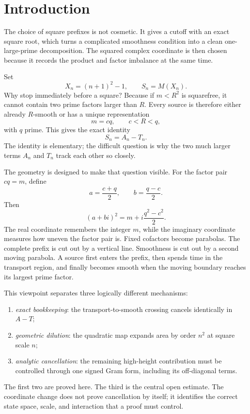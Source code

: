 \section{Introduction}
\label{sec:introduction}

The choice of square prefixes is not cosmetic.  It gives a cutoff with an exact square root, which turns a complicated smoothness condition into a clean one-large-prime decomposition.  The squared complex coordinate is then chosen because it records the product and factor imbalance at the same time.

Set
\[
 X_n=(n+1)^2-1,\qquad S_n=M(X_n).
\]
Why stop immediately before a square?  Because if $m<R^2$ is squarefree, it cannot contain two prime factors larger than $R$.  Every source is therefore either already $R$-smooth or has a unique representation
\[
 m=cq,\qquad c<R<q,
\]
with $q$ prime.  This gives the exact identity
\[
 S_n=A_n-T_n.
\]
The identity is elementary; the difficult question is why the two much larger terms $A_n$ and $T_n$ track each other so closely.

The geometry is designed to make that question visible.  For the factor pair $cq=m$, define
\[
 a=\frac{c+q}{2},\qquad b=\frac{q-c}{2}.
\]
Then
\[
 (a+bi)^2=m+i\frac{q^2-c^2}{2}.
\]
The real coordinate remembers the integer $m$, while the imaginary coordinate measures how uneven the factor pair is.  Fixed cofactors become parabolas.  The complete prefix is cut out by a vertical line.  Smoothness is cut out by a second moving parabola.  A source first enters the prefix, then spends time in the transport region, and finally becomes smooth when the moving boundary reaches its largest prime factor.

This viewpoint separates three logically different mechanisms:
\begin{enumerate}[leftmargin=1.7em,itemsep=0.35em]
\item \emph{exact bookkeeping}: the transport-to-smooth crossing cancels identically in $A-T$;
\item \emph{geometric dilution}: the quadratic map expands area by order $n^2$ at square scale $n$;
\item \emph{analytic cancellation}: the remaining high-height contribution must be controlled through one signed Gram form, including its off-diagonal terms.
\end{enumerate}
The first two are proved here.  The third is the central open estimate.  The coordinate change does not prove cancellation by itself; it identifies the correct state space, scale, and interaction that a proof must control.

